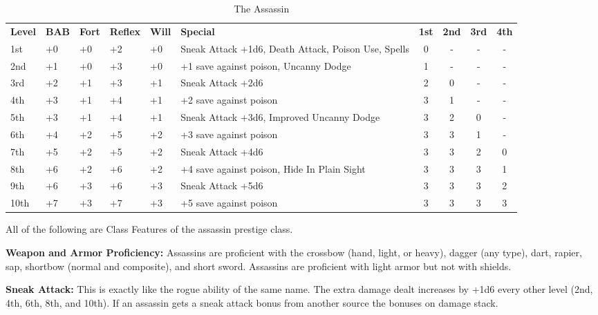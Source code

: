 \begin{table}[htb]
\caption{The Assassin}
\centering
\begin{tabular}{*{6}{l}*{4}{c}}
\textbf{Level} & \textbf{BAB} & \textbf{Fort} & \textbf{Reflex} & \textbf{Will} & \textbf{Special} & \textbf{1st} & \textbf{2nd} & \textbf{3rd} & \textbf{4th} \\
1st & +0 & +0 & +2 & +0 & Sneak Attack +1d6, Death Attack, Poison Use, Spells & 0 & - & - & - \\
2nd & +1 & +0 & +3 & +0 & +1 save against poison, Uncanny Dodge & 1 & - & - & - \\
3rd & +2 & +1 & +3 & +1 & Sneak Attack +2d6 & 2 & 0 & - & - \\
4th & +3 & +1 & +4 & +1 & +2 save against poison & 3 & 1 & - & - \\
5th & +3 & +1 & +4 & +1 & Sneak Attack +3d6, Improved Uncanny Dodge & 3 & 2 & 0 & - \\
6th & +4 & +2 & +5 & +2 & +3 save against poison & 3 & 3 & 1 & - \\
7th & +5 & +2 & +5 & +2 & Sneak Attack +4d6 & 3 & 3 & 2 & 0 \\
8th & +6 & +2 & +6 & +2 & +4 save against poison, Hide In Plain Sight & 3 & 3 & 3 & 1 \\
9th & +6 & +3 & +6 & +3 & Sneak Attack +5d6 & 3 & 3 & 3 & 2 \\
10th & +7 & +3 & +7 & +3 & +5 save against poison & 3 & 3 & 3 & 3 \\
\end{tabular}
\end{table}

\ClassFeatures

All of the following are Class Features of the assassin prestige class.

\textbf{Weapon and Armor Proficiency:} Assassins are proficient with the crossbow 
(hand, light, or heavy), dagger (any type), dart, rapier, sap, shortbow (normal 
and composite), and short sword. Assassins are proficient with light armor but 
not with shields.

\textbf{Sneak Attack:} This is exactly like the rogue ability of the same name. 
The extra damage dealt increases by +1d6 every other level (2nd, 4th, 6th, 8th, 
and 10th). If an assassin gets a sneak attack bonus from another source the bonuses 
on damage stack.

